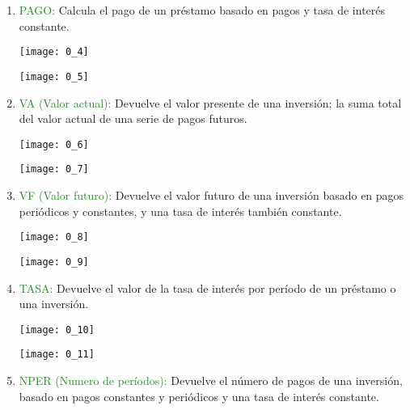 \begin{enumerate}
	      
	      \begin{enumerate}
		      \renewcommand{\labelenumi}{\roman{enumi}}
		      \item \textcolor{ForestGreen}{PAGO:} Calcula el pago de un préstamo basado en pagos y tasa de interés constante.
		            \begin{center}
			            \texttt{[image: 0\_4]} \\
		            \end{center}
		            \begin{center}
			            \texttt{[image: 0\_5]}
		            \end{center}
		      \item \textcolor{ForestGreen}{VA (Valor actual):} Devuelve el valor presente de una inversión; la suma total del valor actual de una serie de pagos futuros.
		            \begin{center}
			            \texttt{[image: 0\_6]} \\
		            \end{center}
		            \begin{center}
			            \texttt{[image: 0\_7]}
		            \end{center}
		      \item \textcolor{ForestGreen}{VF (Valor futuro):} Devuelve el valor futuro de una inversión basado en pagos periódicos y constantes, y una tasa de interés también constante.
		            \begin{center}
			            \texttt{[image: 0\_8]} \\
		            \end{center}
		            \begin{center}
			            \texttt{[image: 0\_9]}
		            \end{center}
		      \item \textcolor{ForestGreen}{TASA:} Devuelve el valor de la tasa de interés por período de un préstamo o una inversión.
		            \begin{center}
			            \texttt{[image: 0\_10]} \\
		            \end{center}
		            \begin{center}
			            \texttt{[image: 0\_11]}
		            \end{center}
		      \item \textcolor{ForestGreen}{NPER (Numero de períodos):} Devuelve el número de pagos de una inversión, basado en pagos constantes y periódicos y una tasa de interés constante.

\end{enumerate}
\end{enumerate}
